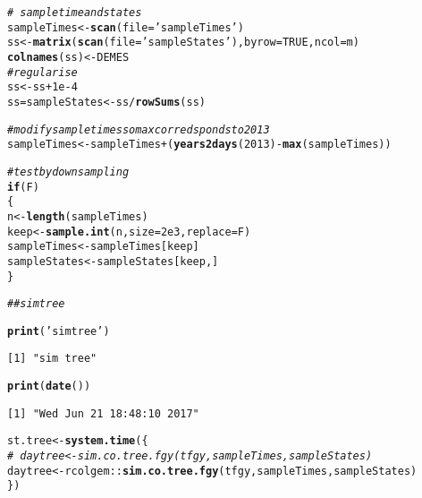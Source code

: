 \documentclass{article}\usepackage[]{graphicx}\usepackage[]{color}
\makeatletter
\newcommand{\hlnum}[1]{\textcolor[rgb]{0.686,0.059,0.569}{#1}}%
\newcommand{\hlstr}[1]{\textcolor[rgb]{0.192,0.494,0.8}{#1}}%
\newcommand{\hlcom}[1]{\textcolor[rgb]{0.678,0.584,0.686}{\textit{#1}}}%
\newcommand{\hlopt}[1]{\textcolor[rgb]{0,0,0}{#1}}%
\newcommand{\hlstd}[1]{\textcolor[rgb]{0.345,0.345,0.345}{#1}}%
\newcommand{\hlkwa}[1]{\textcolor[rgb]{0.161,0.373,0.58}{\textbf{#1}}}%
\newcommand{\hlkwb}[1]{\textcolor[rgb]{0.69,0.353,0.396}{#1}}%
\newcommand{\hlkwc}[1]{\textcolor[rgb]{0.333,0.667,0.333}{#1}}%
\newcommand{\hlkwd}[1]{\textcolor[rgb]{0.737,0.353,0.396}{\textbf{#1}}}%
\newenvironment{kframe}{%
 \def\at@end@of@kframe{}%
 \ifinner\ifhmode%
  \def\at@end@of@kframe{\end{minipage}}%
  \begin{minipage}{\columnwidth}%
 \fi\fi%
 \def\FrameCommand##1{\hskip\@totalleftmargin \hskip-\fboxsep
 \colorbox{shadecolor}{##1}\hskip-\fboxsep
     \hskip-\linewidth \hskip-\@totalleftmargin \hskip\columnwidth}%
 \MakeFramed {\advance\hsize-\width
   \@totalleftmargin\z@ \linewidth\hsize
   \@setminipage}}%
 {\par\unskip\endMakeFramed%
 \at@end@of@kframe}
\newenvironment{knitrout}{}{} %
\makeatother
\begin{document}
\begin{knitrout}
\begin{kframe}
\begin{alltt}
\hlcom{#~  sample time and states}
\hlstd{sampleTimes} \hlkwb{<-} \hlkwd{scan}\hlstd{(} \hlkwc{file} \hlstd{=} \hlstr{'sampleTimes'} \hlstd{)}
\hlstd{ss}  \hlkwb{<-} \hlkwd{matrix}\hlstd{(} \hlkwd{scan}\hlstd{(} \hlkwc{file} \hlstd{=} \hlstr{'sampleStates'} \hlstd{) ,} \hlkwc{byrow}\hlstd{=}\hlnum{TRUE}\hlstd{,} \hlkwc{ncol} \hlstd{= m)}
\hlkwd{colnames}\hlstd{(ss)} \hlkwb{<-} \hlstd{DEMES}
\hlcom{# regularise}
\hlstd{ss} \hlkwb{<-} \hlstd{ss} \hlopt{+} \hlnum{1e-4}
\hlstd{ss} \hlkwb{=} \hlstd{sampleStates} \hlkwb{<-} \hlstd{ss} \hlopt{/} \hlkwd{rowSums}\hlstd{(ss)}

\hlcom{# modify sample times so max corredsponds to 2013 }
\hlstd{sampleTimes} \hlkwb{<-} \hlstd{sampleTimes} \hlopt{+} \hlstd{(}\hlkwd{years2days}\hlstd{(}\hlnum{2013}\hlstd{)} \hlopt{-} \hlkwd{max}\hlstd{(sampleTimes) )}

\hlcom{# test by downsampling}
\hlkwa{if} \hlstd{(F)}
\hlstd{\{}
\hlstd{n} \hlkwb{<-} \hlkwd{length}\hlstd{( sampleTimes )}
\hlstd{keep} \hlkwb{<-} \hlkwd{sample.int}\hlstd{( n,} \hlkwc{size} \hlstd{=} \hlnum{2e3}\hlstd{,} \hlkwc{replace}\hlstd{=F)}
\hlstd{sampleTimes} \hlkwb{<-} \hlstd{sampleTimes[keep]}
\hlstd{sampleStates} \hlkwb{<-} \hlstd{sampleStates[keep, ]}
\hlstd{\}}


\hlcom{## sim tree}

\hlkwd{print}\hlstd{(}\hlstr{'sim tree'}\hlstd{)}
\end{alltt}
\begin{verbatim}
[1] "sim tree"
\end{verbatim}
\begin{alltt}
\hlkwd{print}\hlstd{(}\hlkwd{date}\hlstd{())}
\end{alltt}
\begin{verbatim}
[1] "Wed Jun 21 18:48:10 2017"
\end{verbatim}
\begin{alltt}
\hlstd{st.tree} \hlkwb{<-} \hlkwd{system.time}\hlstd{( \{}
\hlcom{#~ 	daytree <- sim.co.tree.fgy(tfgy,  sampleTimes, sampleStates)}
        \hlstd{daytree} \hlkwb{<-} \hlstd{rcolgem}\hlopt{::}\hlkwd{sim.co.tree.fgy}\hlstd{(tfgy,  sampleTimes, sampleStates)}
\hlstd{\})}
\end{alltt}



\end{kframe}
\end{knitrout}
\end{document}
